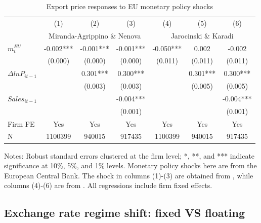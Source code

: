 \begin{table}[htbp]
    \centering
    \caption{Export price responses to EU monetary policy shocks}
    \begin{threeparttable}
    \begin{tabular}{lcccccc}
        \toprule
        & (1)   & (2)   & (3)   & (4)   & (5)   & (6) \\
        & \multicolumn{3}{c}{Miranda-Agrippino \& Nenova} & \multicolumn{3}{c}{Jarocinski \& Karadi}  \\
        \midrule
        $m^{EU}_t$ & -0.002*** & -0.001*** & -0.001*** & -0.050*** & 0.002 & -0.002 \\
              & (0.000) & (0.000) & (0.000) & (0.011) & (0.011) & (0.011)\\  
        $\Delta ln P_{it-1}$ &       & 0.301*** & 0.300*** &       & 0.301*** & 0.300*** \\
              &       & (0.003) & (0.003) &       & (0.005) & (0.005) \\
        $Sales_{it-1}$ &       &       & -0.004*** &       &       & -0.004*** \\
              &       &       & (0.001) &       &       & (0.001) \\
        \midrule
        Firm FE & Yes   & Yes   & Yes   & Yes   & Yes   & Yes \\
         N     & 1100399 & 940015 & 917435 & 1100399 & 940015 & 917435 \\
        \bottomrule
    \end{tabular}
        \begin{tablenotes}
            \footnotesize
            \item Notes: Robust standard errors clustered at the firm level;  *, **, and *** indicate significance at 10\%, 5\%, and 1\% levels. Monetary policy shocks here are from the European Central Bank. The shock in columns (1)-(3) are obtained from \cite{miranda2022tale}, while columns (4)-(6) are  from \cite{jarocinski2020deconstructing}. All regressions include firm fixed effects.
	\end{tablenotes}
    \end{threeparttable}
    \label{tab.EU}
\end{table}

\subsection{Exchange rate regime shift: fixed VS floating}

